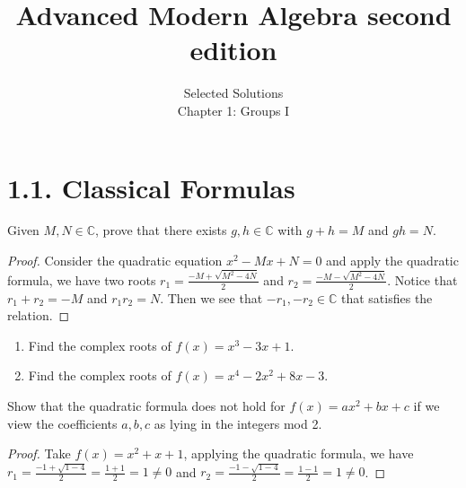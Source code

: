 \documentclass[15pt]{article}
\newenvironment{exercise}[2][Exercise]{\begin{trivlist}
\item[\hskip \labelsep {\bfseries #1}\hskip \labelsep {\bfseries #2.}]}
{\end{trivlist}}
\begin{document}
 
\onehalfspacing
 
\title{Advanced Modern Algebra second edition} 
\author{Selected Solutions\\ 
Chapter 1: Groups I}
 
\maketitle

\section*{1.1.  Classical Formulas}


\begin{exercise}{1.1} 
    Given $M, N \in \mathbb{C}$, prove that there exists $g, h \in \mathbb{C}$ with $g+h=M$ and $gh=N$.
\end{exercise}

\begin{proof}
    Consider the quadratic equation $x^2-Mx+N=0$ and apply the quadratic formula, we have two roots ${r_1 = \frac{-M+ \sqrt{M^2-4N}}2} $ and ${r_2 = \frac{-M - \sqrt{M^2-4N}}2}$. Notice that ${r_1+r_2=-M}$ and ${r_1r_2=N}$. Then we see that $-r_1, -r_2 \in \mathbb{C}$ that satisfies the relation.
\end{proof}


\begin{exercise}{1.3}
    \begin{enumerate}
        \item[(i)] Find the complex roots of $f(x)=x^3-3x+1$.
        \item[(ii)] Find the complex roots of $f(x)=x^4-2x^2+8x-3$.
    \end{enumerate}
\end{exercise}
 


 \begin{exercise}{1.4}
    Show that the quadratic formula does not hold for $f(x)=ax^2+bx+c$ if we view the coefficients $a,b,c$ as lying in the integers mod 2.
 \end{exercise}

 \begin{proof}
    Take $f(x) =x^2+x+1$, applying the quadratic formula, we have $r_1= \frac{-1 + \sqrt{1-4}}2 = \frac{1 + 1}2=1\neq0$ and $r_2= \frac{-1 - \sqrt{1-4}}2 = \frac{1 - 1}2=1\neq0$.
 \end{proof}
\end{document}
